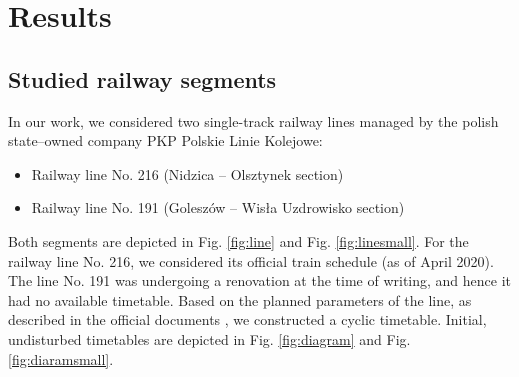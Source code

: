   \section{Results}

\subsection{Studied railway segments}
In our work, we considered two single-track railway lines managed by the polish
state--owned company PKP Polskie Linie Kolejowe:

\begin{itemize}
  \item Railway line No. 216 (Nidzica -- Olsztynek section)
  \item Railway line No. 191 (Goleszów -- Wisła Uzdrowisko section)
\end{itemize}

Both segments are depicted in Fig. \ref{fig:line} and Fig. \ref{fig:linesmall}.
For the railway line No. 216, we considered its official train schedule (as of
April 2020). The line No. 191 was undergoing a renovation at the time of
writing, and hence it had no available timetable. Based on the planned
parameters of the line, as described in the official documents \cite{PKPPLK},
we constructed a cyclic timetable. Initial, undisturbed timetables are depicted
in Fig. \ref{fig:diagram} and Fig. \ref{fig:diaramsmall}.


